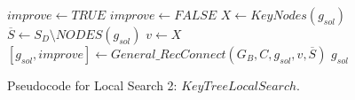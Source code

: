\documentclass{llncs}
\begin{document}

\begin{figure}[H]
\begin{algorithm}[H]
\caption{$g_{sol} = KeyTreeLocalSearch(G_B,C,g_{sol})$}
\begin{algorithmic}[1]
\STATE $improve \leftarrow TRUE$
\STATE $improve \leftarrow FALSE$
\STATE $ X \leftarrow KeyNodes(g_{sol})$ 
\STATE $\overline{S} \leftarrow S_D \setminus NODES(g_{sol})$
\STATE $v \leftarrow X$ 
\STATE $[g_{sol},improve] \leftarrow General\_RecConnect(G_B,C,g_{sol},v,\overline{S})$
\ENDWHILE
\ENDWHILE
\RETURN $g_{sol}$
\end{algorithmic}
\end{algorithm}
\caption{Pseudocode for Local Search 2: $KeyTreeLocalSearch$.\label{alg-ktls}}
\end{figure}
\end{document}
